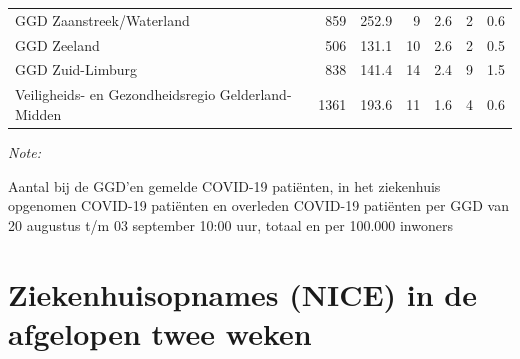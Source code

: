 \documentclass[
  english,
  man,floatsintext]{apa6}
\begin{document}
\begin{table}
\begin{threeparttable}
\begin{tabular}{lrrrrrr}
GGD Zaanstreek/Waterland & 859 & 252.9 & 9 & 2.6 & 2 & 0.6\\
GGD Zeeland & 506 & 131.1 & 10 & 2.6 & 2 & 0.5\\
GGD Zuid-Limburg & 838 & 141.4 & 14 & 2.4 & 9 & 1.5\\
Veiligheids- en Gezondheidsregio Gelderland-Midden & 1361 & 193.6 & 11 & 1.6 & 4 & 0.6\\
\bottomrule
\end{tabular}
\begin{tablenotes}
\item \textit{Note: } 
\item Aantal bij de GGD’en gemelde COVID-19 patiënten, in het ziekenhuis opgenomen COVID-19 patiënten en overleden COVID-19 patiënten per GGD van 20 augustus t/m 03 september 10:00 uur, totaal en per 100.000 inwoners
\end{tablenotes}
\end{threeparttable}
\endgroup{}
\end{table}

\newpage

\hypertarget{ziekenhuisopnames-nice-in-de-afgelopen-twee-weken}{%
\section{Ziekenhuisopnames (NICE) in de afgelopen twee weken}\label{ziekenhuisopnames-nice-in-de-afgelopen-twee-weken}}
\end{document}
